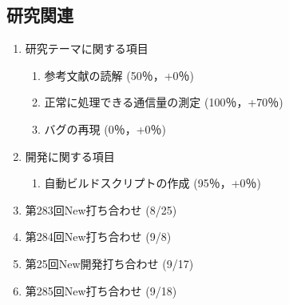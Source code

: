\documentclass[fleqn, 14pt]{extarticle}
\begin{document}
    \subsection{研究関連}
    \label{sec-2-1}
    \begin{enumerate}

        \item 研究テーマに関する項目
            \hfill
            \label{enum-research1}
            \begin{enumerate}

                \item 参考文献の読解
                    \hfill
                    \label{enum-1-A}
                    (50％，+0％)

                \item 正常に処理できる通信量の測定
                    \hfill
                    \label{enum-1-B}
                    (100％，+70％)

                \item バグの再現
                    \hfill
                    \label{enum-1-C}
                    (0％，+0％)

            \end{enumerate}

        \item 開発に関する項目
            \hfill
            \label{enum-research2}
            \begin{enumerate}

                \item 自動ビルドスクリプトの作成
                    \hfill
                    \label{enum-2-A}
                    (95％，+0％)

            \end{enumerate}

        \item 第283回New打ち合わせ
            \hfill
            \label{enum-research3}
            (8/25)

        \item 第284回New打ち合わせ
            \hfill
            \label{enum-research3}
            (9/8)

        \item 第25回New開発打ち合わせ 
            \hfill
            \label{enum-research3}
            (9/17)

        \item 第285回New打ち合わせ
            \hfill
            \label{enum-research3}
            (9/18)

    \end{enumerate}
\end{document}
